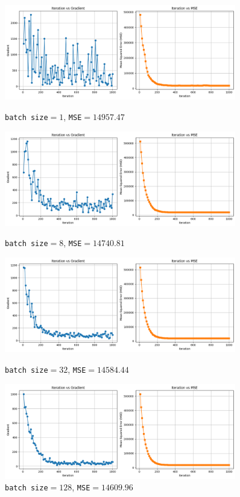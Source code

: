 \documentclass[polish,12pt,a4paper]{extarticle}
\begin{document}
\begin{figure}
    \centering
    \begin{minipage}[b]{0.48\textwidth}
    \includegraphics[width=0.9\textwidth]{b1.png}
    \caption{\texttt{batch size}$=1$, \texttt{MSE}$=14957.47$}
    \end{minipage}
     \hspace{0.02\textwidth}
    \begin{minipage}[b]{0.48\textwidth}
    \includegraphics[width=0.9\textwidth]{b8.png}
    \caption{\texttt{batch size}$=8$, \texttt{MSE}$=14740.81$}
    \end{minipage}
    \hspace{0.02\textwidth}
    \begin{minipage}[b]{0.48\textwidth}
    \includegraphics[width=0.9\textwidth]{b32.png}
    \caption{\texttt{batch size}$=32$, \texttt{MSE}$=14584.44$}
    \end{minipage}
     \hspace{0.02\textwidth}
    \begin{minipage}[b]{0.48\textwidth}
    \includegraphics[width=0.9\textwidth]{b128.png}
    \caption{\texttt{batch size}$=128$, \texttt{MSE}$=14609.96$}
    \end{minipage}
\end{figure} \bigskip \\
\end{document}
